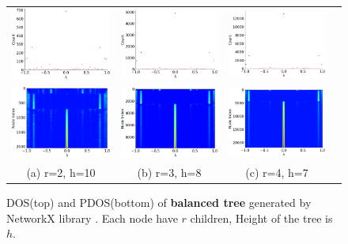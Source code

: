 \documentclass[senior,final,11pt]{iscs-thesis}
\begin{document}
\begin{figure}[htbp]
  \setlength\tabcolsep{0pt}
  \hspace{-1.0cm}
  \begin{tabular}{cccc}
    \includegraphics[width=47mm]{figure/balanced_tree_r2_h10txt_dos.png} &
    \includegraphics[width=47mm]{figure/balanced_tree_r3_h8txt_dos.png} &
    \includegraphics[width=47mm]{figure/balanced_tree_r4_h7txt_dos.png} \\
    \includegraphics[width=47mm]{figure/balanced_tree_r2_h10txt_pdos.png} &
    \includegraphics[width=47mm]{figure/balanced_tree_r3_h8txt_pdos.png} &
    \includegraphics[width=47mm]{figure/balanced_tree_r4_h7txt_pdos.png} \\
    (a) r=2, h=10 & (b) r=3, h=8& (c) r=4, h=7\\ [6pt]
  \end{tabular}
  \caption{DOS(top) and PDOS(bottom) of {\bf balanced tree} generated by NetworkX library \cite{SciPyProceedings_11}. Each node have $r$ children, Height of the tree is $h$.}
  \label{fig:balanced}
\end{figure}
\end{document}
